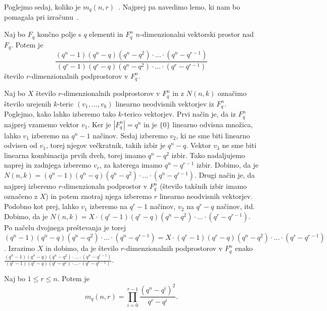 \documentclass[mat1, tisk]{fmfdelo}
\begin{document}
Poglejmo sedaj, koliko je $m_q(n,r)$~\cite{17ravagnani}. Najprej pa navedimo lemo, ki nam bo pomagala 
pri izračunu~\cite{stanley}.
%
\begin{lema}\label{lema4.1}
  Naj bo $F_q$ končno polje s $q$ elementi in $F_q^n$ $n$-dimenzionalni vektorski 
  prostor nad $F_q$. Potem je 
  \begin{equation*}
    \frac{(q^n - 1)(q^n - q)(q^n - q^2)\cdot\ldots\cdot(q^n - q^{r-1})}{(q^r - 1)(q^r - q)(q^n - q^2)\cdot\ldots\cdot(q^r - q^{r-1})}
  \end{equation*}
  število $r$-dimenzionalnih podprostorov v $F_q^n$.
\end{lema}
\begin{dokaz}
  Naj bo $X$ število $r$-dimenzionalnih podprostorov v $F_q^n$ in z $N(n, k)$ označimo 
  število urejenih $k$-teric $(v_1, \ldots, v_k)$ linearno neodvisnih vektorjev iz $F_q^n$. 
  Poglejmo, kako lahko izberemo tako $k$-terico vektorjev. 
  Prvi način je, da iz $F_q^n$ najprej vzamemo vektor $v_1$. Ker je $|F_q^n| = q^n$ 
  in je $\{0\}$ linearno odvisna množica, lahko $v_1$ izberemo na $q^n - 1$ načinov. Sedaj 
  izberemo $v_2$, ki ne sme biti linearno odvisen od $v_1$, torej njegov večkratnik, takih izbir je $q^n - q$. Vektor $v_3$ 
  ne sme biti linearna kombinacija prvih dveh, torej imamo $q^n - q^2$ izbir. Tako nadaljujemo 
  naprej in zadnjega izberemo $v_r$, za katerega imamo $q^n - q^{r-1}$ izbir. Dobimo, da 
  je $N(n, k) = (q^n - 1)(q^n - q)(q^n - q^2)\cdot\ldots\cdot(q^n - q^{r-1})$.
  Drugi način je, da najprej izberemo $r$-dimenzionaln podprostor v $F_q^n$ (število takšnih 
  izbir imamo označeno z $X$) in potem znotraj njega izberemo $r$ linearno neodvisnih 
  vektorjev. Podobno kot prej, lahko $v_1$ izberemo na $q^r - 1$ načinov, $v_2$ na $q^r - q$
  načinov, itd. Dobimo, da je $N(n, k) = X \cdot (q^r - 1)(q^r - q)(q^n - q^2)\cdot\ldots\cdot(q^r - q^{r-1})$.
  Po načelu dvojnega preštevanja je torej 
  $(q^n - 1)(q^n - q)(q^n - q^2)\cdot\ldots\cdot(q^n - q^{r-1}) = X \cdot (q^r - 1)(q^r - q)(q^n - q^2)\cdot\ldots\cdot(q^r - q^{r-1})$. 
  Izrazimo $X$ in dobimo, da je število $r$-dimenzionalnih podprostorov v $F_q^n$ enako 
  $\frac{(q^n - 1)(q^n - q)(q^n - q^2)\cdot\ldots\cdot(q^n - q^{r-1})}{(q^r - 1)(q^r - q)(q^r - q^2)\cdot\ldots\cdot(q^r - q^{r-1})}$.
\end{dokaz}
%
\begin{trditev}\label{trditev4.2}
  Naj bo $1 \leq r \leq n$. Potem je 
  \begin{equation*}
    m_q(n,r) = \prod\limits_{i=0}^{r-1} \frac{(q^n - q^i)^2}{q^r - q^i}.
  \end{equation*}
\end{trditev}
\end{document}
